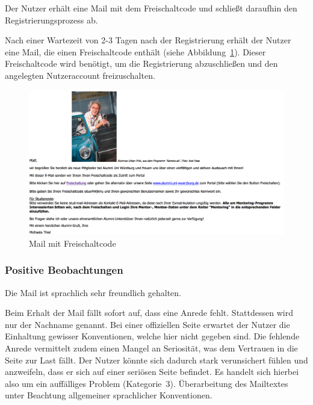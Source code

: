 \label{subsec:freischaltung}
Der Nutzer erhält eine Mail mit dem Freischaltcode und schließt daraufhin den Registrierungsprozess ab.

Nach einer Wartezeit von 2-3 Tagen nach der Registrierung erhält der Nutzer eine Mail, die einen Freischaltcode enthält (siehe Abbildung~\ref{fig:regmail}). Dieser Freischaltcode wird benötigt, um die Registrierung abzuschließen und den angelegten Nutzeraccount freizuschalten.

\begin{figure}
	\centering
		\includegraphics[width=\textwidth]{figures/regmail.jpg}
	\caption{Mail mit Freischaltcode}
	\label{fig:regmail}
\end{figure}

\subsubsection*{Positive Beobachtungen}
\label{subsubsec:freischaltung_mail_positiv}
Die Mail ist sprachlich sehr freundlich gehalten.

{
Beim Erhalt der Mail fällt sofort auf, dass eine Anrede fehlt. Stattdessen wird nur der Nachname genannt.
}
{
Bei einer offiziellen Seite erwartet der Nutzer die Einhaltung gewisser Konventionen, welche hier nicht gegeben sind. Die fehlende Anrede vermittelt zudem einen Mangel an Seriosität, was dem Vertrauen in die Seite zur Last fällt. Der Nutzer könnte sich dadurch stark verunsichert fühlen und anzweifeln, dass er sich auf einer seriösen Seite befindet. Es handelt sich hierbei also um ein auffälliges Problem (Kategorie~3).
}
{
Überarbeitung des Mailtextes unter Beachtung allgemeiner sprachlicher Konventionen.
}
\label{prob:frei:mailanrede}

